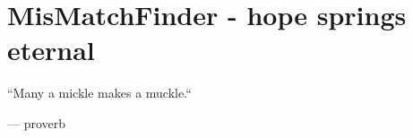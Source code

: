 \chapter[Mismatchfinder]{MisMatchFinder - hope springs eternal}
\label{ch:mmf}

\epigraph{``Many a mickle makes a muckle.``}{--- \textup{proverb}}



